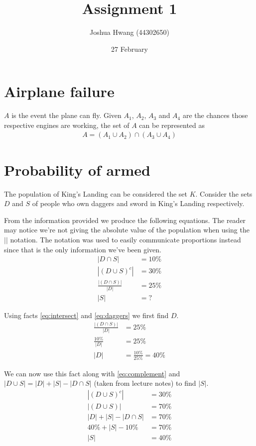 \documentclass{article}
\title{Assignment 1}
\author{Joshua Hwang (44302650)}
\date{27 February}
\begin{document}
\maketitle

\section{Airplane failure}
$A$ is the event the plane can fly. Given $A_1$, $A_2$, $A_3$ and $A_4$ are the
chances those respective engines are working,
the set of $A$ can be represented as
\begin{align*}
    A = (A_1 \cup A_2) \cap (A_3 \cup A_4)
\end{align*}

\section{Probability of armed}
The population of King's Landing can be considered the set $K$.
Consider the sets $D$ and $S$ of people who own daggers and sword in King's
Landing respectively.

From the information provided we produce the following equations. The reader
may notice we're not giving the absolute value of the population when using the
$||$ notation. The notation was used to easily communicate proportions instead
since that is the only information we've been given.
\begin{align}
    |D \cap S| &= 10\% \label{eq:intersect} \\
    |(D \cup S)^c| &= 30\% \label{eq:complement} \\
    \frac{|(D \cap S)|}{|D|} &= 25\% \label{eq:daggers} \\
    |S| &= ?
\end{align}

Using facts \eqref{eq:intersect} and \eqref{eq:daggers} we first find $D$.
\begin{align*}
    \frac{|(D \cap S)|}{|D|} &= 25\% \\
    \frac{10\%}{|D|} &= 25\% \\
    |D| &= \frac{10\%}{25\%} = 40\%
\end{align*}

We can now use this fact along with \eqref{eq:complement} and 
$|D \cup S| = |D| + |S| - |D \cap S|$ (taken from lecture notes) to find $|S|$.
\begin{align*}
    |(D \cup S)^c| &= 30\% \\
    |(D \cup S)| &= 70\% \\
    |D| + |S| - |D \cap S| &= 70\% \\
    40\% + |S| - 10\% &= 70\% \\
    |S| &= 40\%
\end{align*}
\end{document}
